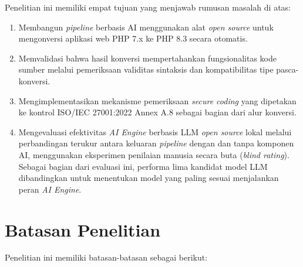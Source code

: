 Penelitian ini memiliki empat tujuan yang menjawab rumusan masalah
di atas:

\begin{enumerate}
    \item Membangun \textit{pipeline} berbasis AI menggunakan alat
    \textit{open source} untuk mengonversi aplikasi web PHP 7.x ke
    PHP 8.3 secara otomatis.
    \item Memvalidasi bahwa hasil konversi mempertahankan
    fungsionalitas kode sumber melalui pemeriksaan validitas sintaksis
    dan kompatibilitas tipe pasca-konversi.
    \item Mengimplementasikan mekanisme pemeriksaan \textit{secure
    coding} yang dipetakan ke kontrol ISO/IEC 27001:2022 Annex A.8
    sebagai bagian dari alur konversi.
    \item Mengevaluasi efektivitas \textit{AI Engine} berbasis LLM 
\textit{open source} lokal melalui perbandingan terukur antara keluaran 
\textit{pipeline} dengan dan tanpa komponen AI, menggunakan eksperimen 
penilaian manusia secara buta (\textit{blind rating}). Sebagai bagian 
dari evaluasi ini, performa lima kandidat model LLM dibandingkan untuk 
menentukan model yang paling sesuai menjalankan peran \textit{AI Engine}.

\end{enumerate}

\section{Batasan Penelitian}

Penelitian ini memiliki batasan-batasan sebagai berikut:

